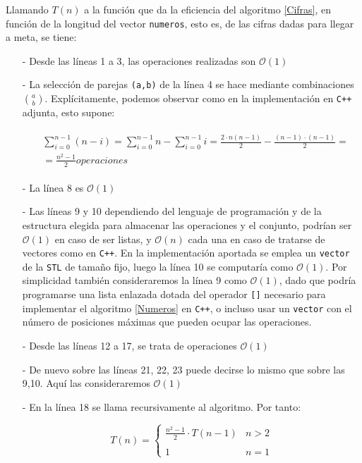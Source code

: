 \documentclass[a4paper,10pt]{scrartcl}
\def\C++#1{\texttt{#1}}
\begin{document}
   Llamando $T(n)$ a la función que da la eficiencia del algoritmo \ref{Cifras},
   en función de la longitud del vector \C++{numeros}, esto es, de las cifras
   dadas para llegar a meta, se tiene:
   \begin{itemize} 
    \item [-] Desde las líneas 1 a 3, las operaciones realizadas son $\mathcal{O}(1)$
    \item [-] La selección de parejas \C++{(a,b)} de la línea 4 se hace mediante
    combinaciones ${a \choose b}$. Explícitamente, podemos observar como en
    la implementación en \C++{C++} adjunta, esto supone:
    
    \begin{gather*}
    \begin{split}
        &\sum_{i=0}^{n-1}(n-i)=\sum_{i=0}^{n-1}n-\sum_{i=0}^{n-1}i=
        \frac{2\cdot n(n-1)}{2}-\frac{(n-1)\cdot(n-1)}{2}=\\
        &=\frac{n^2-1}{2}  operaciones 
    \end{split}
    \end{gather*}
        
    \item [-] La línea 8 es $\mathcal{O}(1)$
    \item [-] Las líneas 9 y 10 dependiendo del lenguaje de programación y de
    la estructura elegida para almacenar las operaciones y el conjunto, podrían
    ser $\mathcal{O}(1)$ en caso de ser listas, y $\mathcal{O}(n)$ cada una en
    caso de tratarse de vectores como en \C++{C++}. En la implementación
    aportada se emplea un \C++{vector} de la \C++{STL} de tamaño fijo,
    luego la línea 10 se computaría como $\mathcal{O}(1)$. Por simplicidad
    también consideraremos la línea 9 como $\mathcal{O}(1)$, dado que podría
    programarse una lista enlazada dotada del operador \C++{[]} necesario
    para implementar el algoritmo \ref{Numeros} en \C++{C++}, o incluso usar
    un \C++{vector} con el número de posiciones máximas que pueden ocupar las
    operaciones.
    
    \item [-] Desde las líneas 12 a 17, se trata de operaciones $\mathcal{O}(1)$
    \item [-] De nuevo sobre las líneas 21, 22, 23 puede decirse lo mismo que sobre
    las 9,10. Aquí las consideraremos $\mathcal{O}(1)$
    \item [-] En la línea 18 se llama recursivamente al algoritmo. Por tanto:
    
    $$T(n)=\left\{\begin{array}{lr}
                   \frac{n^2-1}{2}\cdot T(n-1) & n>2\\
                   \ \\
                   1 & n=1
                  \end{array}\right.$$
                  

\end{itemize}
\end{document}
